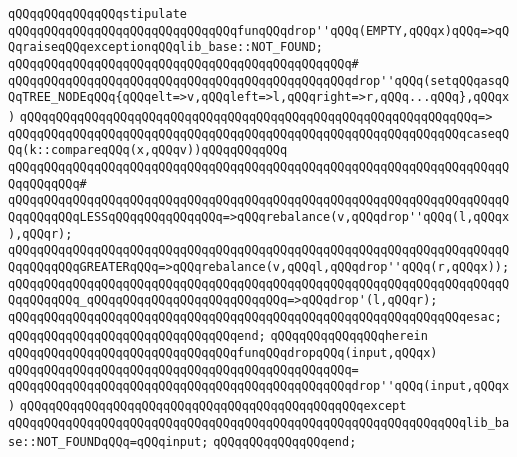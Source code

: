 \newline
\verb|qQQqqQQqqQQqqQQqstipulate|\newline
\verb|qQQqqQQqqQQqqQQqqQQqqQQqqQQqqQQqfunqQQqdrop''qQQq(EMPTY,qQQqx)qQQq=>qQQqraiseqQQqexceptionqQQqlib_base::NOT_FOUND;|\newline
\verb|qQQqqQQqqQQqqQQqqQQqqQQqqQQqqQQqqQQqqQQqqQQqqQQq#|\newline
\verb|qQQqqQQqqQQqqQQqqQQqqQQqqQQqqQQqqQQqqQQqqQQqqQQqdrop''qQQq(setqQQqasqQQqTREE_NODEqQQq{qQQqelt=>v,qQQqleft=>l,qQQqright=>r,qQQq...qQQq},qQQqx)|\newline
\verb|qQQqqQQqqQQqqQQqqQQqqQQqqQQqqQQqqQQqqQQqqQQqqQQqqQQqqQQqqQQqqQQq=>|\newline
\verb|qQQqqQQqqQQqqQQqqQQqqQQqqQQqqQQqqQQqqQQqqQQqqQQqqQQqqQQqqQQqqQQqcaseqQQq(k::compareqQQq(x,qQQqv))qQQqqQQqqQQq|\newline
\verb|qQQqqQQqqQQqqQQqqQQqqQQqqQQqqQQqqQQqqQQqqQQqqQQqqQQqqQQqqQQqqQQqqQQqqQQqqQQqqQQq#|\newline
\verb|qQQqqQQqqQQqqQQqqQQqqQQqqQQqqQQqqQQqqQQqqQQqqQQqqQQqqQQqqQQqqQQqqQQqqQQqqQQqqQQqLESSqQQqqQQqqQQqqQQq=>qQQqrebalance(v,qQQqdrop''qQQq(l,qQQqx),qQQqr);|\newline
\verb|qQQqqQQqqQQqqQQqqQQqqQQqqQQqqQQqqQQqqQQqqQQqqQQqqQQqqQQqqQQqqQQqqQQqqQQqqQQqqQQqGREATERqQQq=>qQQqrebalance(v,qQQql,qQQqdrop''qQQq(r,qQQqx));|\newline
\verb|qQQqqQQqqQQqqQQqqQQqqQQqqQQqqQQqqQQqqQQqqQQqqQQqqQQqqQQqqQQqqQQqqQQqqQQqqQQqqQQq_qQQqqQQqqQQqqQQqqQQqqQQqqQQq=>qQQqdrop'(l,qQQqr);|\newline
\verb|qQQqqQQqqQQqqQQqqQQqqQQqqQQqqQQqqQQqqQQqqQQqqQQqqQQqqQQqqQQqqQQqesac;|\newline
\verb|qQQqqQQqqQQqqQQqqQQqqQQqqQQqqQQqend;|\newline
\verb|qQQqqQQqqQQqqQQqherein|\newline
\verb|qQQqqQQqqQQqqQQqqQQqqQQqqQQqqQQqfunqQQqdropqQQq(input,qQQqx)|\newline
\verb|qQQqqQQqqQQqqQQqqQQqqQQqqQQqqQQqqQQqqQQqqQQqqQQq=|\newline
\verb|qQQqqQQqqQQqqQQqqQQqqQQqqQQqqQQqqQQqqQQqqQQqqQQqdrop''qQQq(input,qQQqx)|\newline
\verb|qQQqqQQqqQQqqQQqqQQqqQQqqQQqqQQqqQQqqQQqqQQqqQQqexcept|\newline
\verb|qQQqqQQqqQQqqQQqqQQqqQQqqQQqqQQqqQQqqQQqqQQqqQQqqQQqqQQqqQQqqQQqlib_base::NOT_FOUNDqQQq=qQQqinput;|\newline
\verb|qQQqqQQqqQQqqQQqend;|\newline
\newline
